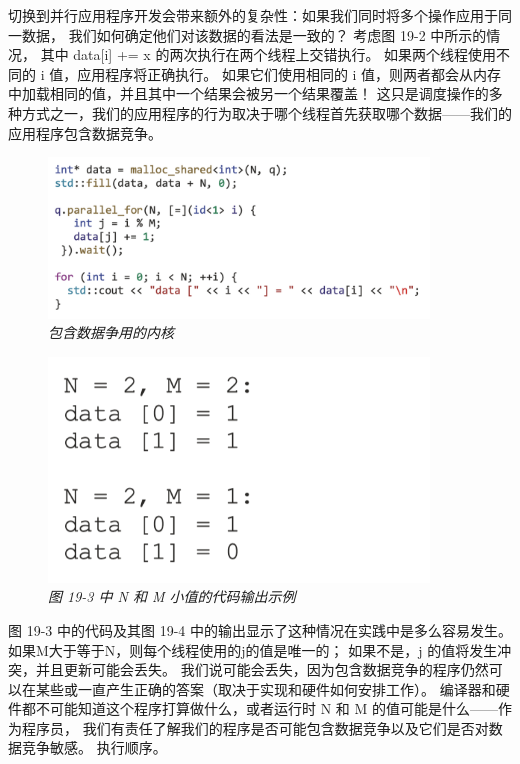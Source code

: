 切换到并行应用程序开发会带来额外的复杂性：如果我们同时将多个操作应用于同一数据，
我们如何确定他们对该数据的看法是一致的？ 考虑图 19-2 中所示的情况，
其中 data[i] += x 的两次执行在两个线程上交错执行。 如果两个线程使用不同的 i 值，应用程序将正确执行。 
如果它们使用相同的 i 值，则两者都会从内存中加载相同的值，并且其中一个结果会被另一个结果覆盖！
 这只是调度操作的多种方式之一，我们的应用程序的行为取决于哪个线程首先获取哪个数据——我们的应用程序包含数据竞争。
 
 \begin{figure}[H]
	\centering
	\includegraphics[width=0.9\textwidth]{figs/F19.3.png}
	\caption{\textit{包含数据争用的内核 }}
\end{figure}

\begin{figure}[H]
	\centering
	\includegraphics[width=0.9\textwidth]{figs/F19.4.png}
	\caption{\textit{图 19-3 中 N 和 M 小值的代码输出示例 }}
\end{figure}

图 19-3 中的代码及其图 19-4 中的输出显示了这种情况在实践中是多么容易发生。 
如果M大于等于N，则每个线程使用的j的值是唯一的； 如果不是，j 的值将发生冲突，并且更新可能会丢失。 
我们说可能会丢失，因为包含数据竞争的程序仍然可以在某些或一直产生正确的答案（取决于实现和硬件如何安排工作）。 
编译器和硬件都不可能知道这个程序打算做什么，或者运行时 N 和 M 的值可能是什么——作为程序员，
我们有责任了解我们的程序是否可能包含数据竞争以及它们是否对数据竞争敏感。 执行顺序。

